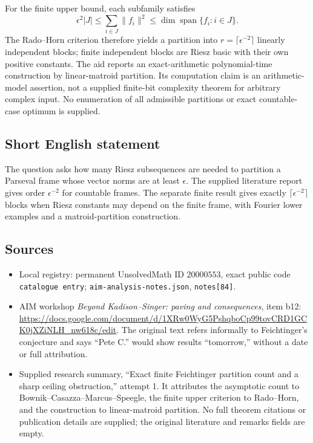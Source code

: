 \documentclass[11pt]{article}
\begin{document}
For the finite upper bound, each subfamily satisfies
\[
 \epsilon^2|J|\leq\sum_{i\in J}\|f_i\|^2
 \leq\dim\operatorname{span}\{f_i:i\in J\}.
\]
The Rado--Horn criterion therefore yields a partition into \(r=\lceil\epsilon^{-2}\rceil\) linearly independent blocks; finite independent blocks are Riesz basic with their own positive constants. The aid reports an exact-arithmetic polynomial-time construction by linear-matroid partition. Its computation claim is an arithmetic-model assertion, not a supplied finite-bit complexity theorem for arbitrary complex input. No enumeration of all admissible partitions or exact countable-case optimum is supplied.
\subsection{Short English statement}
The question asks how many Riesz subsequences are needed to partition a Parseval frame whose vector norms are at least \(\epsilon\). The supplied literature report gives order \(\epsilon^{-2}\) for countable frames. The separate finite result gives exactly \(\lceil\epsilon^{-2}\rceil\) blocks when Riesz constants may depend on the finite frame, with Fourier lower examples and a matroid-partition construction.
\subsection{Sources}
\begin{itemize}
\item Local registry: permanent UnsolvedMath ID \(20000553\), exact public code \texttt{catalogue entry}; \texttt{aim-analysis-notes.json}, \texttt{notes[84]}.
\item AIM workshop \emph{Beyond Kadison--Singer: paving and consequences}, item b12: \url{https://docs.google.com/document/d/1XRw0WyG5PshqboCp99tovCRD1GCK0jXZiNLH_nw618c/edit}. The original text refers informally to Feichtinger's conjecture and says ``Pete C.'' would show results ``tomorrow,'' without a date or full attribution.
\item Supplied research summary, ``Exact finite Feichtinger partition count and a sharp ceiling obstruction,'' attempt 1. It attributes the asymptotic count to Bownik--Casazza--Marcus--Speegle, the finite upper criterion to Rado--Horn, and the construction to linear-matroid partition. No full theorem citations or publication details are supplied; the original literature and remarks fields are empty.
\end{itemize}
\end{document}
